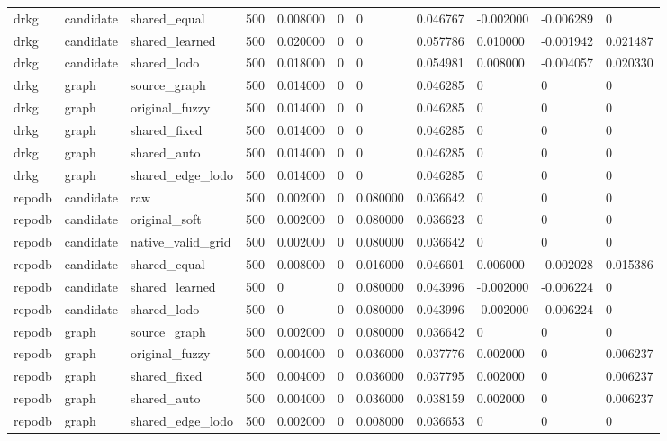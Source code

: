 \begin{tabular}{lllllllllll}
drkg & candidate & shared\_equal & 500 & 0.008000 & 0 & 0 & 0.046767 & -0.002000 & -0.006289 & 0 \\
drkg & candidate & shared\_learned & 500 & 0.020000 & 0 & 0 & 0.057786 & 0.010000 & -0.001942 & 0.021487 \\
drkg & candidate & shared\_lodo & 500 & 0.018000 & 0 & 0 & 0.054981 & 0.008000 & -0.004057 & 0.020330 \\
drkg & graph & source\_graph & 500 & 0.014000 & 0 & 0 & 0.046285 & 0 & 0 & 0 \\
drkg & graph & original\_fuzzy & 500 & 0.014000 & 0 & 0 & 0.046285 & 0 & 0 & 0 \\
drkg & graph & shared\_fixed & 500 & 0.014000 & 0 & 0 & 0.046285 & 0 & 0 & 0 \\
drkg & graph & shared\_auto & 500 & 0.014000 & 0 & 0 & 0.046285 & 0 & 0 & 0 \\
drkg & graph & shared\_edge\_lodo & 500 & 0.014000 & 0 & 0 & 0.046285 & 0 & 0 & 0 \\
repodb & candidate & raw & 500 & 0.002000 & 0 & 0.080000 & 0.036642 & 0 & 0 & 0 \\
repodb & candidate & original\_soft & 500 & 0.002000 & 0 & 0.080000 & 0.036623 & 0 & 0 & 0 \\
repodb & candidate & native\_valid\_grid & 500 & 0.002000 & 0 & 0.080000 & 0.036642 & 0 & 0 & 0 \\
repodb & candidate & shared\_equal & 500 & 0.008000 & 0 & 0.016000 & 0.046601 & 0.006000 & -0.002028 & 0.015386 \\
repodb & candidate & shared\_learned & 500 & 0 & 0 & 0.080000 & 0.043996 & -0.002000 & -0.006224 & 0 \\
repodb & candidate & shared\_lodo & 500 & 0 & 0 & 0.080000 & 0.043996 & -0.002000 & -0.006224 & 0 \\
repodb & graph & source\_graph & 500 & 0.002000 & 0 & 0.080000 & 0.036642 & 0 & 0 & 0 \\
repodb & graph & original\_fuzzy & 500 & 0.004000 & 0 & 0.036000 & 0.037776 & 0.002000 & 0 & 0.006237 \\
repodb & graph & shared\_fixed & 500 & 0.004000 & 0 & 0.036000 & 0.037795 & 0.002000 & 0 & 0.006237 \\
repodb & graph & shared\_auto & 500 & 0.004000 & 0 & 0.036000 & 0.038159 & 0.002000 & 0 & 0.006237 \\
repodb & graph & shared\_edge\_lodo & 500 & 0.002000 & 0 & 0.008000 & 0.036653 & 0 & 0 & 0 \\
\hline
\end{tabular}